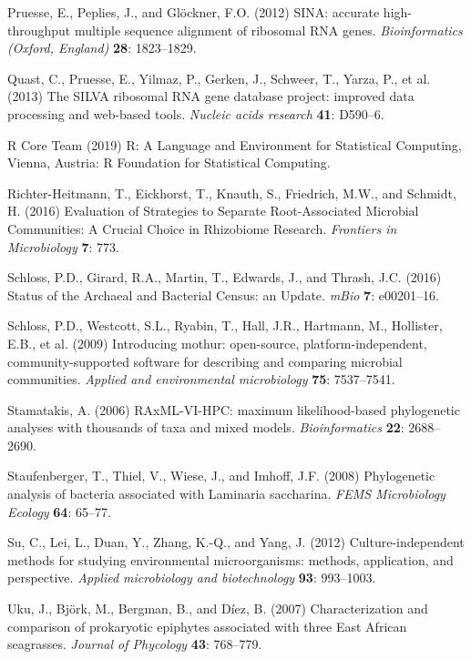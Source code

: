 \documentclass[12pt,]{article}
\begin{document}
\hypertarget{ref-Pruesse2012}{}
Pruesse, E., Peplies, J., and Glöckner, F.O. (2012) SINA: accurate
high-throughput multiple sequence alignment of ribosomal RNA genes.
\emph{Bioinformatics (Oxford, England)} \textbf{28}: 1823--1829.

\hypertarget{ref-Quast2013}{}
Quast, C., Pruesse, E., Yilmaz, P., Gerken, J., Schweer, T., Yarza, P.,
et al. (2013) The SILVA ribosomal RNA gene database project: improved
data processing and web-based tools. \emph{Nucleic acids research}
\textbf{41}: D590--6.

\hypertarget{ref-RCoreTeam2019}{}
R Core Team (2019) R: A Language and Environment for Statistical
Computing, Vienna, Austria: R Foundation for Statistical Computing.

\hypertarget{ref-Richter-Heitmann2016}{}
Richter-Heitmann, T., Eickhorst, T., Knauth, S., Friedrich, M.W., and
Schmidt, H. (2016) Evaluation of Strategies to Separate Root-Associated
Microbial Communities: A Crucial Choice in Rhizobiome Research.
\emph{Frontiers in Microbiology} \textbf{7}: 773.

\hypertarget{ref-Schloss2016}{}
Schloss, P.D., Girard, R.A., Martin, T., Edwards, J., and Thrash, J.C.
(2016) Status of the Archaeal and Bacterial Census: an Update.
\emph{mBio} \textbf{7}: e00201--16.

\hypertarget{ref-Schloss2009}{}
Schloss, P.D., Westcott, S.L., Ryabin, T., Hall, J.R., Hartmann, M.,
Hollister, E.B., et al. (2009) Introducing mothur: open-source,
platform-independent, community-supported software for describing and
comparing microbial communities. \emph{Applied and environmental
microbiology} \textbf{75}: 7537--7541.

\hypertarget{ref-Stamatakis2006}{}
Stamatakis, A. (2006) RAxML-VI-HPC: maximum likelihood-based
phylogenetic analyses with thousands of taxa and mixed models.
\emph{Bioinformatics} \textbf{22}: 2688--2690.

\hypertarget{ref-Staufenberger2008}{}
Staufenberger, T., Thiel, V., Wiese, J., and Imhoff, J.F. (2008)
Phylogenetic analysis of bacteria associated with Laminaria saccharina.
\emph{FEMS Microbiology Ecology} \textbf{64}: 65--77.

\hypertarget{ref-Su2012}{}
Su, C., Lei, L., Duan, Y., Zhang, K.-Q., and Yang, J. (2012)
Culture-independent methods for studying environmental microorganisms:
methods, application, and perspective. \emph{Applied microbiology and
biotechnology} \textbf{93}: 993--1003.

\hypertarget{ref-Uku2007}{}
Uku, J., Björk, M., Bergman, B., and Díez, B. (2007) Characterization
and comparison of prokaryotic epiphytes associated with three East
African seagrasses. \emph{Journal of Phycology} \textbf{43}: 768--779.
\end{document}
